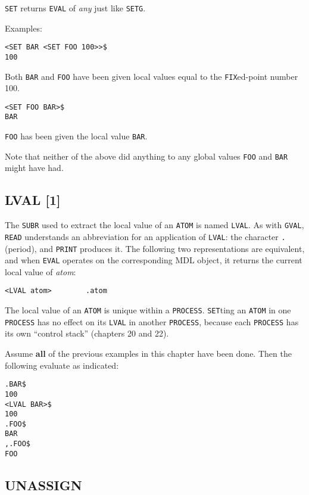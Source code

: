 \documentclass[a4paper]{scrbook}
\begin{document}
\texttt{SET} returns \texttt{EVAL} of \emph{any} just like \texttt{SETG}.

Examples:

\begin{verbatim}
<SET BAR <SET FOO 100>>$
100
\end{verbatim}

Both \texttt{BAR} and \texttt{FOO} have been given local values equal to the \texttt{FIX}ed-point number 100.

\begin{verbatim}
<SET FOO BAR>$
BAR
\end{verbatim}

\texttt{FOO} has been given the local value \texttt{BAR}.

Note that neither of the above did anything to any global values \texttt{FOO} and \texttt{BAR} might have had.

\subsection{LVAL {[}1{]}}\label{lval-1}

The \texttt{SUBR} used to extract the local value of an \texttt{ATOM} is named \texttt{LVAL}.
As with \texttt{GVAL}, \texttt{READ} understands an abbreviation for an application of \texttt{LVAL}: the character
\texttt{.}  (period), and \texttt{PRINT} produces it. The following two representations are
equivalent, and when \texttt{EVAL} operates on the corresponding MDL object, it returns the current local value of
\emph{atom}:

\begin{verbatim}
<LVAL atom>        .atom
\end{verbatim}

The local value of an \texttt{ATOM} is unique within a \texttt{PROCESS}. \texttt{SET}ting an \texttt{ATOM} in one
\texttt{PROCESS} has no effect on its \texttt{LVAL} in another \texttt{PROCESS}, because each \texttt{PROCESS} has its own
``control stack'' (chapters 20 and 22).

Assume \textbf{all} of the previous examples in this chapter have been done. Then the following evaluate as indicated:

\begin{verbatim}
.BAR$
100
<LVAL BAR>$
100
.FOO$
BAR
,.FOO$
FOO
\end{verbatim}

\subsection{UNASSIGN}\label{unassign}
\end{document}
